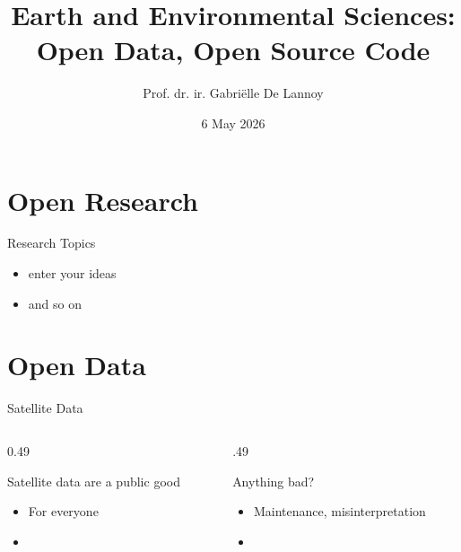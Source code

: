 \documentclass[11pt,t]{beamer}
\title{Earth and Environmental Sciences:\\Open Data, Open Source Code}
\author{Prof. dr. ir. Gabri\"elle De Lannoy}
\institute{KU Leuven - Faculty Bioscience Engineering}
\date{6 May 2026}
\begin{document}

\begin{frame}
	\titlepage
\end{frame}

    
\section{Open Research}

\begin{frame}{Research Topics}
\begin{itemize}
    \item enter your ideas
    \item and so on
\end{itemize}
\end{frame}

\section{Open Data}

\begin{frame}{Satellite Data}

\vspace{-0.2cm}
\begin{columns}[t]
\begin{column}[T]{0.49\linewidth}
	\begin{block}{Satellite data are a public good}
    \begin{itemize}
		\item For everyone
        \item
    \end{itemize}
	\end{block}
\end{column}
\begin{column}[T]{.49\textwidth}
\begin{alertblock}{Anything bad?} %
	   \begin{itemize}
		\item Maintenance, misinterpretation
        \item 
	   \end{itemize}
	\end{alertblock}
\end{column}
\end{columns}

\end{frame}
\end{document}
